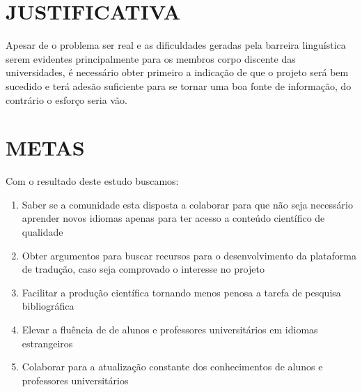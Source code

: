 \section{JUSTIFICATIVA}
\label{sec:introJustificativa}
Apesar de o problema ser real e as dificuldades geradas pela barreira linguística serem evidentes principalmente para os membros corpo discente das universidades, é necessário obter primeiro a indicação de que o projeto será bem sucedido e terá adesão suficiente para se tornar uma boa fonte de informação, do contrário o esforço seria vão.

\section{METAS}
\label{sec:introMetas}
Com o resultado deste estudo buscamos:
\begin{enumerate}
	\item Saber se a comunidade esta disposta a colaborar para que não seja necessário aprender novos idiomas apenas para ter acesso a conteúdo científico de qualidade
	\item Obter argumentos para buscar recursos para o desenvolvimento da plataforma de tradução, caso seja comprovado o interesse no projeto
	\item Facilitar a produção científica tornando menos penosa a tarefa de pesquisa bibliográfica
	\item Elevar a fluência de de alunos e professores universitários em idiomas estrangeiros
	\item Colaborar para a atualização constante dos conhecimentos de alunos e professores universitários
\end{enumerate}
